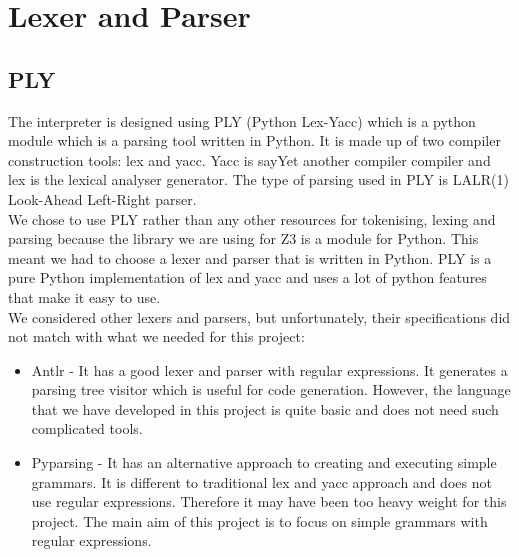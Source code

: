 \documentclass[a4paper]{report}
\begin{document}
\section{Lexer and Parser} 
\subsection{PLY}
The interpreter is designed using PLY\cite{ply} (Python Lex-Yacc) which is a python module which is a parsing tool written in Python. It is made up of two compiler construction tools: lex and yacc\cite{plylexyacc}. Yacc is say{Yet another compiler compiler} and lex is the lexical analyser generator. The type of parsing used in PLY is LALR(1)\cite{lalr} Look-Ahead Left-Right parser.\\

We chose to use PLY rather than any other resources for tokenising, lexing and parsing because the library we are using for Z3 is a module for Python. This meant we had to choose a lexer and parser that is written in Python. PLY is a pure Python implementation of lex and yacc and uses a lot of python features that make it easy to use. \\

We considered other lexers and parsers, but unfortunately, their specifications did not match with what we needed for this project:
\begin{itemize}
\item Antlr\cite{antlr} - It has a good lexer and parser with regular expressions. It generates a parsing tree visitor which is useful for code generation. However, the language that we have developed in this project is quite basic and does not need such complicated tools.
\item Pyparsing\cite{pyparsing} - It has an alternative approach to creating and executing simple grammars. It is different to traditional lex and yacc approach and does not use regular expressions. Therefore it may have been too heavy weight for this project. The main aim of this project is to focus on simple grammars with regular expressions.
\end{itemize}
\end{document}
